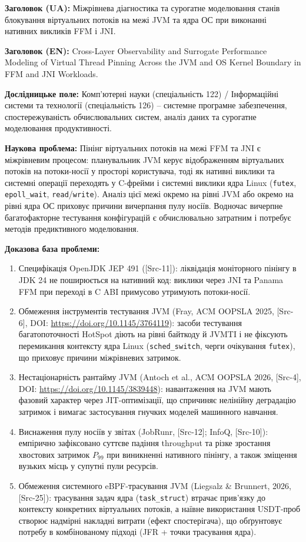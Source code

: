 \textbf{Заголовок (UA):} Міжрівнева діагностика та сурогатне моделювання станів блокування віртуальних потоків на межі JVM та ядра ОС при виконанні нативних викликів FFM і JNI.

\textbf{Заголовок (EN):} \foreignlanguage{english}{Cross-Layer Observability and Surrogate Performance Modeling of Virtual Thread Pinning Across the JVM and OS Kernel Boundary in FFM and JNI Workloads.}

\textbf{Дослідницьке поле:} Комп'ютерні науки (спеціальність 122) / Інформаційні системи та технології (спеціальність 126) -- системне програмне забезпечення, спостережуваність обчислювальних систем, аналіз даних та сурогатне моделювання продуктивності.

\textbf{Наукова проблема:} Пінінг віртуальних потоків на межі FFM та JNI є міжрівневим процесом: планувальник JVM керує відображенням віртуальних потоків на потоки-носії у просторі користувача, тоді як нативні виклики та системні операції переходять у C-фрейми і системні виклики ядра Linux (\texttt{futex}, \texttt{epoll\_wait}, \texttt{read}/\texttt{write}). Аналіз цієї межі окремо на рівні JVM або окремо на рівні ядра ОС приховує причини вичерпання пулу носіїв. Водночас вичерпне багатофакторне тестування конфігурацій є обчислювально затратним і потребує методів предиктивного моделювання.

\textbf{Доказова база проблеми:}
\begin{enumerate}[wide]
    \item Специфікація OpenJDK JEP 491 ([Src-11]): ліквідація моніторного пінінгу в JDK 24 не поширюється на нативний код: виклики через JNI та Panama FFM при переході в C ABI примусово утримують потоки-носії.
    \item Обмеження інструментів тестування JVM (Fray, ACM OOPSLA 2025, [Src-6], DOI: \url{https://doi.org/10.1145/3764119}): засоби тестування багатопоточності HotSpot діють на рівні байткоду й JVMTI і не фіксують перемикання контексту ядра Linux (\texttt{sched\_switch}, черги очікування \texttt{futex}), що приховує причини міжрівневих затримок.
    \item Нестаціонарність рантайму JVM (Antoch et al., ACM OOPSLA 2026, [Src-4], DOI: \url{https://doi.org/10.1145/3839448}): навантаження на JVM мають фазовий характер через JIT-оптимізації, що спричиняє нелінійну деградацію затримок і вимагає застосування гнучких моделей машинного навчання.
    \item Виснаження пулу носіїв у звітах (JobRunr, [Src-12]; InfoQ, [Src-10]): емпірично зафіксовано суттєве падіння throughput та різке зростання хвостових затримок $P_{99}$ при виникненні нативного пінінгу, а також зміщення вузьких місць у супутні пули ресурсів.
    \item Обмеження системного eBPF-трасування JVM (Liegsalz \& Brunnert, 2026, [Src-25]): трасування задач ядра (\texttt{task\_struct}) втрачає прив'язку до контексту конкретних віртуальних потоків, а наївне використання USDT-проб створює надмірні накладні витрати (ефект спостерігача), що обґрунтовує потребу в комбінованому підході (JFR + точки трасування ядра).
\end{enumerate}

